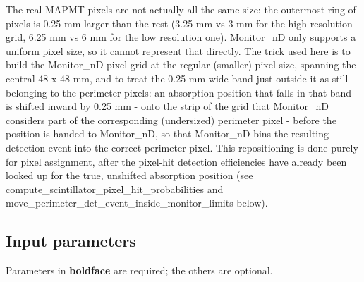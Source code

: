 The real MAPMT pixels are not actually all the same size: the outermost ring of pixels is 0.25 mm larger than the rest (3.25 mm vs 3 mm for the high resolution grid, 6.25 mm vs 6 mm for the low resolution one). Monitor\_nD only supports a uniform pixel size, so it cannot represent that directly. The trick used here is to build the Monitor\_nD pixel grid at the regular (smaller) pixel size, spanning the central 48 x 48 mm, and to treat the 0.25 mm wide band just outside it as still belonging to the perimeter pixels: an absorption position that falls in that band is shifted inward by 0.25 mm - onto the strip of the grid that Monitor\_nD considers part of the corresponding (undersized) perimeter pixel - before the position is handed to Monitor\_nD, so that Monitor\_nD bins the resulting detection event into the correct perimeter pixel. This repositioning is done purely for pixel assignment, after the pixel-hit detection efficiencies have already been looked up for the true, unshifted absorption position (see compute\_scintillator\_pixel\_hit\_probabilities and move\_perimeter\_det\_event\_inside\_monitor\_limits below).

\subsection*{Input parameters}
Parameters in \textbf{boldface} are required; the others are optional.

